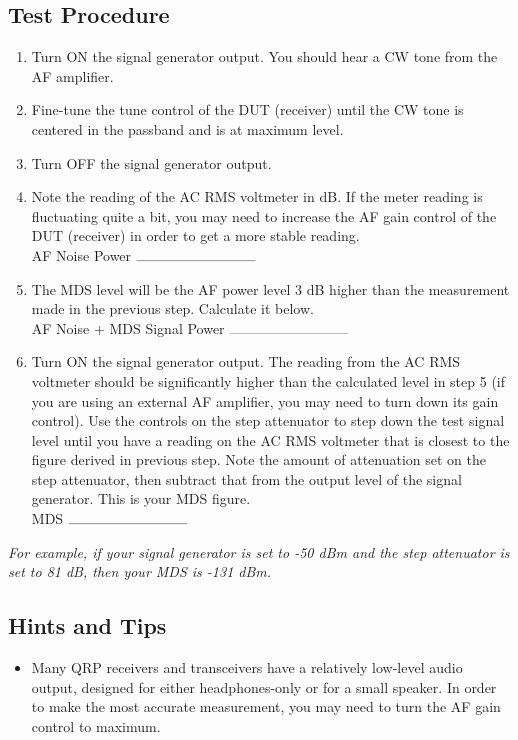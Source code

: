 \documentclass[10pt,letterpaper]{book}
\begin{document}
\subsection*{Test Procedure}
\begin{enumerate}
	\item Turn ON the signal generator output. You should hear a CW tone from the AF amplifier.
	\item Fine-tune the tune control of the DUT (receiver) until the CW tone is centered in the passband and is at maximum level.
	\item Turn OFF the signal generator output.
	\item Note the reading of the AC RMS voltmeter in dB. If the meter reading is fluctuating quite a bit, you may need to increase the AF gain control of the DUT (receiver) in order to get a more stable reading.
	\vspace{30pt}
	\\AF Noise Power $\rule{3cm}{0.1mm}$
	\item The MDS level will be the AF power level 3 dB higher than the measurement made in the previous step. Calculate it below.
	\vspace{30pt}
	\\AF Noise + MDS Signal Power $\rule{3cm}{0.1mm}$
	\item Turn ON the signal generator output. The reading from the AC RMS voltmeter should be significantly higher than the calculated level in step 5 (if you are using an external AF amplifier, you may need to turn down its gain control). Use the controls on the step attenuator to step down the test signal level until you have a reading on the AC RMS voltmeter that is closest to the figure derived in previous step. Note the amount of attenuation set on the step attenuator, then subtract that from the output level of the signal generator. This is your MDS figure.
	\vspace{30pt}	
	\\MDS $\rule{3cm}{0.1mm}$
\end{enumerate}
\emph{For example, if your signal generator is set to -50 dBm and the step attenuator is set to 81 dB, then your MDS is -131 dBm.}
\subsection*{Hints and Tips}
\begin{itemize}
	\item Many QRP receivers and transceivers have a relatively low-level audio output, designed for either headphones-only or for a small speaker. In order to make the most accurate measurement, you may need to turn the AF gain control to maximum.
\end{itemize}
\end{document}
